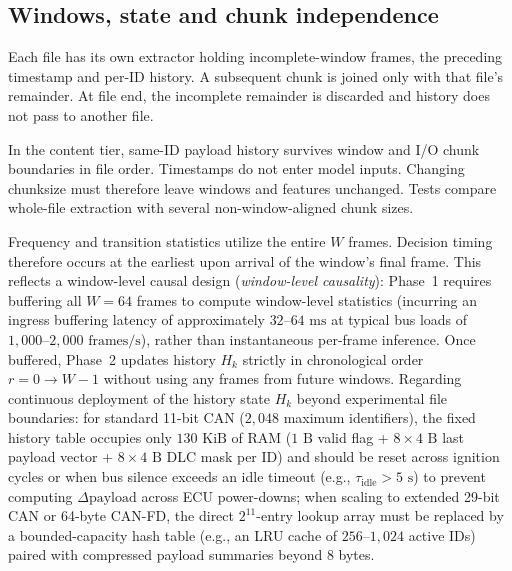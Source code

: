 \documentclass[12pt, a4paper, reqno, oneside]{book}
\begin{document}
\subsection{Windows, state and chunk independence}
Each file has its own extractor holding incomplete-window frames, the preceding timestamp and per-ID history. A subsequent chunk is joined only with that file's remainder. At file end, the incomplete remainder is discarded and history does not pass to another file.

In the content tier, same-ID payload history survives window and I/O chunk boundaries in file order. Timestamps do not enter model inputs. Changing chunksize must therefore leave windows and features unchanged. Tests compare whole-file extraction with several non-window-aligned chunk sizes.

Frequency and transition statistics utilize the entire $W$ frames. Decision timing therefore occurs at the earliest upon arrival of the window's final frame. This reflects a window-level causal design (\textit{window-level causality}): Phase~1 requires buffering all $W=64$ frames to compute window-level statistics (incurring an ingress buffering latency of approximately $32\text{--}64\text{ ms}$ at typical bus loads of $1{,}000\text{--}2{,}000\text{ frames/s}$), rather than instantaneous per-frame inference. Once buffered, Phase~2 updates history $H_k$ strictly in chronological order $r=0\to W-1$ without using any frames from future windows. Regarding continuous deployment of the history state $H_k$ beyond experimental file boundaries: for standard 11-bit CAN ($2{,}048$ maximum identifiers), the fixed history table occupies only $130\text{ KiB}$ of RAM ($1\text{ B}$ valid flag + $8\times 4\text{ B}$ last payload vector + $8\times 4\text{ B}$ DLC mask per ID) and should be reset across ignition cycles or when bus silence exceeds an idle timeout (e.g., $\tau_{\text{idle}}>5\text{ s}$) to prevent computing $\Delta\text{payload}$ across ECU power-downs; when scaling to extended 29-bit CAN or 64-byte CAN-FD, the direct $2^{11}$-entry lookup array must be replaced by a bounded-capacity hash table (e.g., an LRU cache of $256\text{--}1{,}024$ active IDs) paired with compressed payload summaries beyond 8 bytes.
\end{document}
